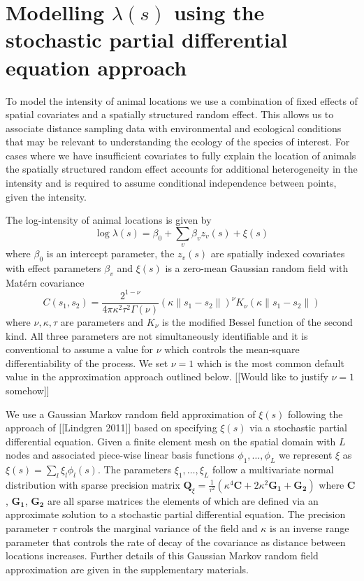 \documentclass[preprint,12pt]{elsarticle}
\newcommand{\bm}{\boldsymbol}  %
\begin{document}
\section*{Modelling $\lambda(s)$ using the stochastic partial differential equation approach}

To model the intensity of animal locations we use a combination of fixed effects of spatial covariates and a spatially structured random effect.  This allows us to associate distance sampling data with environmental and ecological conditions that may be relevant to understanding the ecology of the species of interest.  For cases where we have insufficient covariates to fully explain the location of animals the spatially structured random effect accounts for additional heterogeneity in the intensity and is required to assume conditional independence between points, given the intensity.

The log-intensity of animal locations is given by
\begin{equation*}
\log \lambda(s) = \beta_0 + \sum_v \beta_v z_v(s) + \xi(s)
\end{equation*}
where $\beta_0$ is an intercept parameter, the $z_v(s)$ are spatially indexed covariates with effect parameters $\beta_v$ and $\xi(s)$ is a zero-mean Gaussian random field with Mat\'ern covariance
\begin{equation}
C(s_1,s_2) = \frac{2^{1-\nu}}{4\pi\kappa^2\tau^2\Gamma(\nu)}(\kappa \|s_1-s_2\|)^{\nu}K_\nu(\kappa \|s_1-s_2\|)
\end{equation}
where \(\nu, \kappa, \tau\) are parameters and \(K_{\nu}\) is the modified Bessel function of the second kind.  All three parameters are not simultaneously identifiable and it is conventional to assume a value for $\nu$ which controls the mean-square differentiability of the process.  We set $\nu = 1$ which is the most common default value in the approximation approach outlined below.  [[Would like to justify $\nu = 1$ somehow]]

We use a Gaussian Markov random field approximation of $\xi(s)$ following the approach of [[Lindgren 2011]] based on specifying $\xi(s)$ via a stochastic partial differential equation.  Given a finite element mesh on the spatial domain with $L$ nodes and associated piece-wise linear basis functions $\phi_1, \ldots, \phi_L$ we represent $\xi$ as $\xi(s) = \sum_l \xi_l \phi_l(s)$.  The parameters $\xi_1, \ldots, \xi_L$ follow a multivariate normal distribution with sparse precision matrix $\bm{Q}_{\xi} = \frac{1}{\tau^2}\left(\kappa^4\bm{C} + 2\kappa^2\bm{G_1} + \bm{G_2}\right)$ where $\bm{C}$, $\bm{G_1}$, $\bm{G_2}$ are all sparse matrices the elements of which are defined via an approximate solution to a stochastic partial differential equation. The precision parameter $\tau$ controls the marginal variance of the field and $\kappa$ is an inverse range parameter that controls the rate of decay of the covariance as distance between locations increases.  Further details of this Gaussian Markov random field approximation are given in the supplementary materials.
\end{document}
